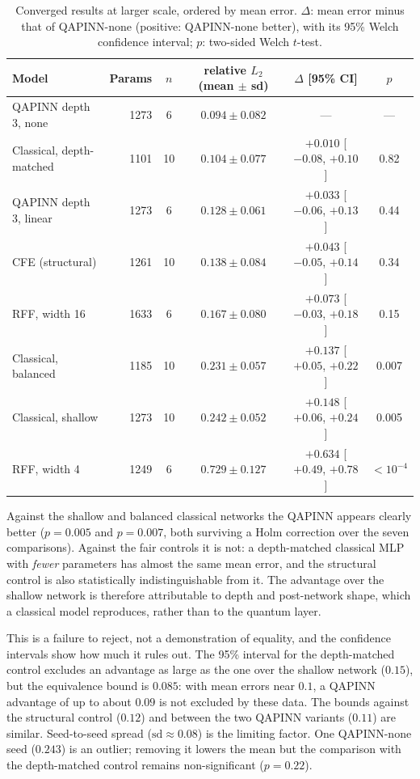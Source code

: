\documentclass[11pt]{article}
\newcommand{\relL}{relative $L_2$}
\begin{document}
\begin{table}[t]
  \centering\small
  \begin{tabular}{lrcccc}
    \toprule
    Model & Params & $n$ & \relL{} (mean $\pm$ sd) & $\Delta$ [95\% CI] & $p$ \\
    \midrule
    QAPINN depth 3, none & 1273 & 6 & $\mathbf{0.094\pm0.082}$ & --- & --- \\
    Classical, depth-matched & 1101 & 10 & $0.104\pm0.077$ & $+0.010$ [$-0.08$, $+0.10$] & 0.82 \\
    QAPINN depth 3, linear & 1273 & 6 & $0.128\pm0.061$ & $+0.033$ [$-0.06$, $+0.13$] & 0.44 \\
    CFE (structural) & 1261 & 10 & $0.138\pm0.084$ & $+0.043$ [$-0.05$, $+0.14$] & 0.34 \\
    RFF, width 16 & 1633 & 6 & $0.167\pm0.080$ & $+0.073$ [$-0.03$, $+0.18$] & 0.15 \\
    Classical, balanced & 1185 & 10 & $0.231\pm0.057$ & $+0.137$ [$+0.05$, $+0.22$] & 0.007 \\
    Classical, shallow & 1273 & 10 & $0.242\pm0.052$ & $+0.148$ [$+0.06$, $+0.24$] & 0.005 \\
    RFF, width 4 & 1249 & 6 & $0.729\pm0.127$ & $+0.634$ [$+0.49$, $+0.78$] & $<10^{-4}$ \\
    \bottomrule
  \end{tabular}
  \caption{Converged results at larger scale, ordered by mean error. $\Delta$: mean error
  minus that of QAPINN-none (positive: QAPINN-none better), with its 95\% Welch confidence
  interval; $p$: two-sided Welch $t$-test.}
  \label{tab:large}
\end{table}

Against the shallow and balanced classical networks the QAPINN appears clearly better
($p=0.005$ and $p=0.007$, both surviving a Holm correction over the seven comparisons).
Against the fair controls it is not: a depth-matched classical MLP with \emph{fewer}
parameters has almost the same mean error, and the structural control is also
statistically indistinguishable from it. The advantage over the
shallow network is therefore attributable to depth and post-network shape, which a
classical model reproduces, rather than to the quantum layer.

This is a failure to reject, not a demonstration of equality, and the confidence
intervals show how much it rules out. The 95\% interval for the depth-matched control
excludes an advantage as large as the one over the shallow network ($0.15$), but the
equivalence bound is $0.085$: with mean errors near $0.1$, a QAPINN advantage of up to
about $0.09$ is not excluded by these data. The bounds against the structural control
($0.12$) and between the two QAPINN variants ($0.11$) are similar. Seed-to-seed spread
($\mathrm{sd}\approx0.08$) is the limiting factor. One QAPINN-none seed ($0.243$) is an
outlier; removing it lowers the mean but the comparison with the depth-matched control
remains non-significant ($p=0.22$).
\end{document}
